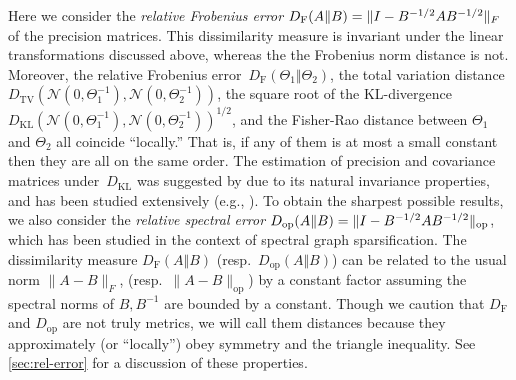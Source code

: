 \documentclass[aos]{imsart}
\theoremstyle{definition}
\numberwithin{equation}{section}
\DeclareMathOperator{\op}{op}
\DeclarePairedDelimiter{\norm}{\lVert}{\rVert}
\newcommand{\DF}{D_{\operatorname{F}}}
\newcommand{\Dop}{D_{\operatorname{op}}}
\newcommand{\DKL}{D_{\operatorname{KL}}}
\newcommand{\DTV}{D_{\operatorname{TV}}}
\begin{document}
Here we consider the \emph{relative Frobenius error} $\DF(A \Vert B) = \norm{I - B^{-1/2} A B^{-1/2}}_F$ of the precision matrices.
This dissimilarity measure is invariant under the linear transformations discussed above, whereas the the Frobenius norm distance is not.
Moreover, the relative Frobenius error~$\DF(\Theta_1 \Vert \Theta_2)$, the total variation distance $\DTV(\mathcal{N}(0, \Theta_1^{-1}), \mathcal{N}(0, \Theta_2^{-1}))$, the square root of the KL-divergence $\DKL(\mathcal{N}(0, \Theta_1^{-1}), \mathcal{N}(0, \Theta_2^{-1}))^{1/2}$, and the Fisher-Rao distance between $\Theta_1$ and $\Theta_2$ all coincide ``locally.''
That is, if any of them is at most a small constant then they are all on the same order.
The estimation of precision and covariance matrices under~$\DKL$ was suggested by \cite{james1992estimation} due to its natural invariance properties, and has been studied extensively (e.g., \cite{ledoit2012nonlinear}).
To obtain the sharpest possible results, we also consider the \emph{relative spectral error} $\Dop(A \Vert B) = \norm{I - B^{-1/2} A B^{-1/2}}_{\op}$, which has been studied in the context of spectral graph sparsification.
The dissimilarity measure $\DF(A\Vert B)$ (resp.\ $\Dop(A\Vert B)$) can be related to the usual norm $\|A - B\|_F$, (resp.\ $\|A - B\|_{\op}$) by a constant factor assuming the spectral norms of $B, B^{-1}$ are bounded by a constant.
Though we caution that $\DF$ and $\Dop$ are not truly metrics, we will call them distances because they approximately (or ``locally'') obey symmetry and the triangle inequality.
See \cref{sec:rel-error} for a discussion of these properties.
\end{document}
